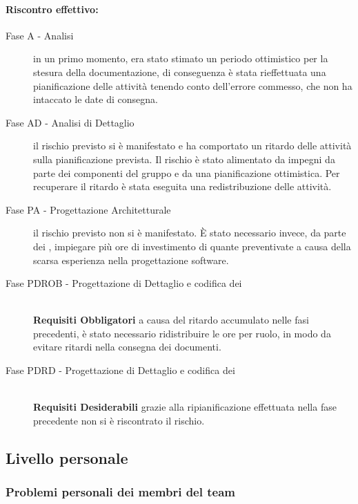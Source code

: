 \documentclass[../PianoProgetto.tex]{subfiles}
\begin{document}
	\paragraph*{Riscontro effettivo:} 
		\begin{description}
			\item[Fase A - Analisi] in un primo momento, era stato stimato un periodo ottimistico per la stesura della documentazione, di conseguenza è stata rieffettuata una pianificazione delle attività tenendo conto dell'errore commesso, che non ha intaccato le date di consegna.
			\item[Fase AD - Analisi di Dettaglio] il rischio previsto si è manifestato e ha comportato un ritardo delle attività sulla pianificazione prevista. Il rischio è stato alimentato da impegni da parte dei componenti del gruppo e da una pianificazione ottimistica. Per recuperare il ritardo è stata eseguita una redistribuzione delle attività.
			\item[Fase PA - Progettazione Architetturale] il rischio previsto non si è manifestato. È stato necessario invece, da parte dei \progettisti, impiegare più ore di investimento di quante preventivate a causa della scarsa esperienza nella progettazione software\g.
			\item[Fase PDROB - Progettazione di Dettaglio e codifica dei]  \ \\
					\textbf{Requisiti Obbligatori} a causa del ritardo accumulato nelle fasi precedenti, è stato necessario ridistribuire le ore per ruolo, in modo da evitare ritardi nella consegna dei documenti.
			\item[Fase PDRD - Progettazione di Dettaglio e codifica dei] \ \\
					\textbf{Requisiti Desiderabili} grazie alla ripianificazione effettuata nella fase precedente non si è riscontrato il rischio.
		\end{description}
		

\newpage
\subsection{Livello personale}

\subsubsection{Problemi personali dei membri del team}
\label{sec:Problemi personali dei membri del team}
\end{document}
